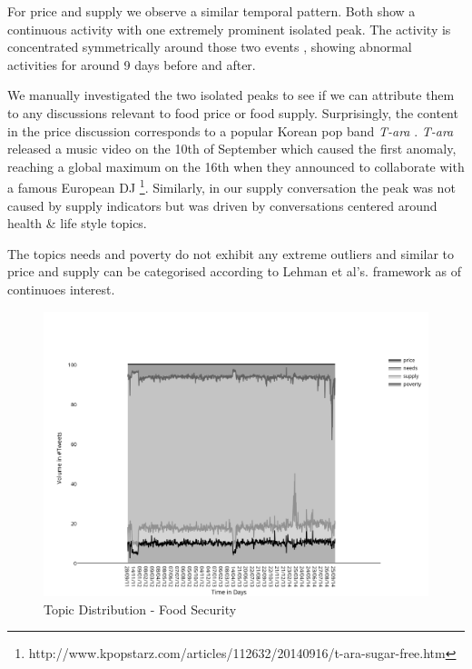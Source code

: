 For price and supply we observe a similar temporal pattern. Both show a continuous activity with one extremely prominent isolated peak. The activity is concentrated symmetrically around those two events , showing abnormal activities for around 9 days before and after. 

 We manually investigated the two isolated peaks to see if we can attribute them to any discussions relevant to food price or food supply. Surprisingly, the content in the price discussion corresponds to a popular Korean pop band \emph{T-ara }. \emph{T-ara } released a music video on the 10th of September which caused the first anomaly, reaching a global maximum on the 16th when they announced to collaborate with a famous European DJ  \footnote{http://www.kpopstarz.com/articles/112632/20140916/t-ara-sugar-free.htm}. Similarly, in our supply conversation the peak was not caused by supply indicators but was driven by conversations centered around health \& life style topics. 

The topics needs and poverty do not exhibit any extreme outliers and similar to price and supply can be categorised according to Lehman et al's. framework as of continuoes interest. 




\begin{figure}[H]
        \centering
         \includegraphics[width=1\textwidth ]{img/anal/topic_dist}
              
        \caption{Topic Distribution - Food Security}
        \label{fig:topic_dist}
\end{figure}




